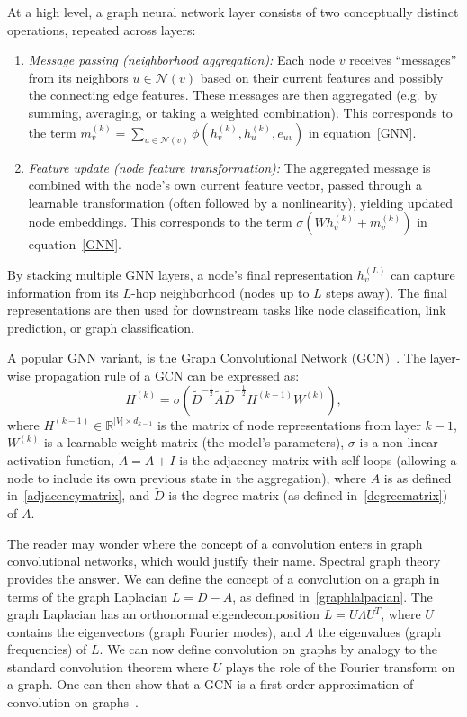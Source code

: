 At a high level, a graph neural network layer consists of two conceptually distinct operations, repeated across layers:
\begin{enumerate}

\item {\em Message passing (neighborhood aggregation):}
Each node $v$ receives ``messages'' from its neighbors $u \in \mathcal{N}(v)$
based on their current features and possibly the connecting edge features.
These messages are then aggregated (e.g. by summing, averaging, or taking a weighted combination). This corresponds to the term
$m_v^{(k)}=\sum_{u \in \mathcal{N}(v)} \phi(h_v^{(k)}, h_u^{(k)}, e_{uv})$ in equation~\eqref{GNN}.
\item {\em Feature update (node feature transformation):}
The aggregated message is combined with the node’s own current feature vector, passed through a learnable transformation (often followed by a nonlinearity), yielding updated node 
embeddings. This corresponds to the 
term $\sigma(W  h_v^{(k)} + m_v^{(k)})$ in equation~\eqref{GNN}.
\end{enumerate}
By stacking multiple GNN layers, a node's final representation $h_v^{(L)}$ can capture information from its $L$-hop neighborhood (nodes up to $L$ steps away). The final representations are then used for downstream tasks like node classification, link prediction, or graph classification. 


A popular GNN variant, is the Graph Convolutional Network (GCN)~\cite{Kipf2017}. The layer-wise propagation rule of a GCN can be expressed as:
$$
H^{(k)} = \sigma \left( \tilde{D}^{-\frac{1}{2}} \tilde{A} \tilde{D}^{-\frac{1}{2}} H^{(k-1)} W^{(k)} \right),
$$
where $H^{(k-1)} \in \mathbb{R}^{|V| \times d_{k-1}}$ is the matrix of node representations from layer $k-1$, $W^{(k)}$ is a learnable weight matrix (the model's parameters), $\sigma$ is a non-linear activation function,
$\tilde{A} = A + I$ is the adjacency matrix with self-loops (allowing a node to include its own previous state in the aggregation), where $A$ is as defined in~\eqref{adjacencymatrix}, and
$\tilde{D}$ is the degree matrix (as defined in~\eqref{degreematrix}) of $\tilde{A}$.

The reader may wonder where the concept of a convolution enters in graph convolutional networks, which would justify their name. Spectral graph theory provides the answer. We can define the concept of a convolution on a graph in terms of the graph Laplacian
$L = D - A$, as defined in~\eqref{graphlalpacian}.
The graph Laplacian has an orthonormal eigendecomposition $L = U \Lambda U^T$,
where $U$ contains the eigenvectors (graph Fourier modes), and $\Lambda$
the eigenvalues (graph frequencies) of $L$.
We can now  define convolution on graphs by analogy to the standard convolution theorem where $U$ plays the role of the Fourier transform on a graph. One can then show that a GCN is a  first-order approximation of  convolution on graphs~\cite{defferrard2016convolutional}.




